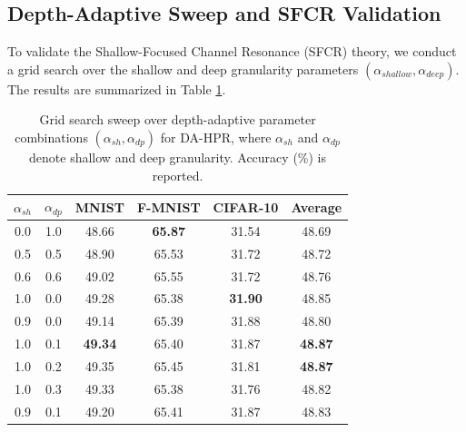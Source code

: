 \documentclass{article}
\theoremstyle{plain}
\theoremstyle{definition}
\theoremstyle{remark}
\begin{document}
\subsection{Depth-Adaptive Sweep and SFCR Validation}
To validate the Shallow-Focused Channel Resonance (SFCR) theory, we conduct a grid search over the shallow and deep granularity parameters $(\alpha_{shallow}, \alpha_{deep})$. The results are summarized in Table \ref{submission3:tab:depth_sweep}.

\begin{table}[t]
\caption{Grid search sweep over depth-adaptive parameter combinations $(\alpha_{sh}, \alpha_{dp})$ for DA-HPR, where $\alpha_{sh}$ and $\alpha_{dp}$ denote shallow and deep granularity. Accuracy (\%) is reported.}
\label{submission3:tab:depth_sweep}
\vskip 0.15in
\begin{center}
\begin{small}
\begin{sc}
\setlength{\tabcolsep}{4pt}
\begin{tabular}{cccccc}
\toprule
$\alpha_{sh}$ & $\alpha_{dp}$ & MNIST & F-MNIST & CIFAR-10 & Average \\
\midrule
0.0 & 1.0 & 48.66 & \textbf{65.87} & 31.54 & 48.69 \\
0.5 & 0.5 & 48.90 & 65.53 & 31.72 & 48.72 \\
0.6 & 0.6 & 49.02 & 65.55 & 31.72 & 48.76 \\
1.0 & 0.0 & 49.28 & 65.38 & \textbf{31.90} & 48.85 \\
0.9 & 0.0 & 49.14 & 65.39 & 31.88 & 48.80 \\
1.0 & 0.1 & \textbf{49.34} & 65.40 & 31.87 & \textbf{48.87} \\
1.0 & 0.2 & 49.35 & 65.45 & 31.81 & \textbf{48.87} \\
1.0 & 0.3 & 49.33 & 65.38 & 31.76 & 48.82 \\
0.9 & 0.1 & 49.20 & 65.41 & 31.87 & 48.83 \\
\bottomrule
\end{tabular}
\end{sc}
\end{small}
\end{center}
\vskip -0.1in
\end{table}
\end{document}
